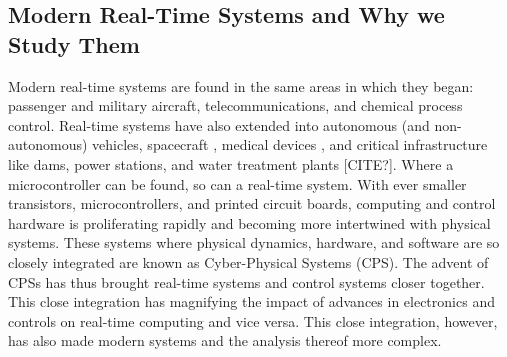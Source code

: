 \subsection{Modern Real-Time Systems and Why we Study Them}


Modern real-time systems are found in the same areas in which they began: passenger and military aircraft, telecommunications, and chemical process control.
Real-time systems have also extended into autonomous (and non-autonomous) vehicles, spacecraft \cite{vavra_real-time_2018}, medical devices \cite{jiang_real-time_2010}, and critical infrastructure like dams, power stations, and water treatment plants [CITE?].
Where a microcontroller can be found, so can a real-time system.
With ever smaller transistors, microcontrollers, and printed circuit boards, computing and control hardware is proliferating rapidly and becoming more intertwined with physical systems.
These systems where physical dynamics, hardware, and software are so closely integrated are known as Cyber-Physical Systems (CPS).
The advent of CPSs has thus brought real-time systems and control systems closer together.
This close integration has magnifying the impact of advances in electronics and controls on real-time computing and vice versa.
This close integration, however, has also made modern systems and the analysis thereof more complex.

